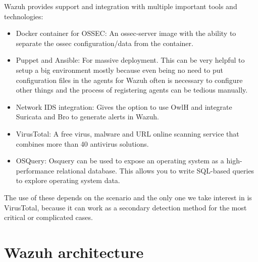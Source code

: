 \linej
\linej
Wazuh provides support and integration with multiple important tools and technologies:
\begin{itemize}
	\item Docker container for OSSEC: An ossec-server image with the ability to separate the ossec configuration/data from the container.
	\item Puppet and Ansible: For massive deployment. This can be very helpful to setup a big environment mostly because even being no need to put configuration files in the agents for Wazuh often is necessary to configure other things and the process of registering agents can be tedious manually.
	\item Network IDS integration: Gives the option to use OwlH and integrate Suricata and Bro to generate alerts in Wazuh.
	\item VirusTotal: A free virus, malware and URL online scanning service that combines more than 40 antivirus solutions.
	\item OSQuery: Osquery can be used to expose an operating system as a high-performance relational database. This allows you to write SQL-based queries to explore operating system data.
\end{itemize}
\linej
The use of these depends on the scenario and the only one we take interest in is VirusTotal, because it can work as a secondary detection method for the most critical or complicated cases.

\section{Wazuh architecture}

